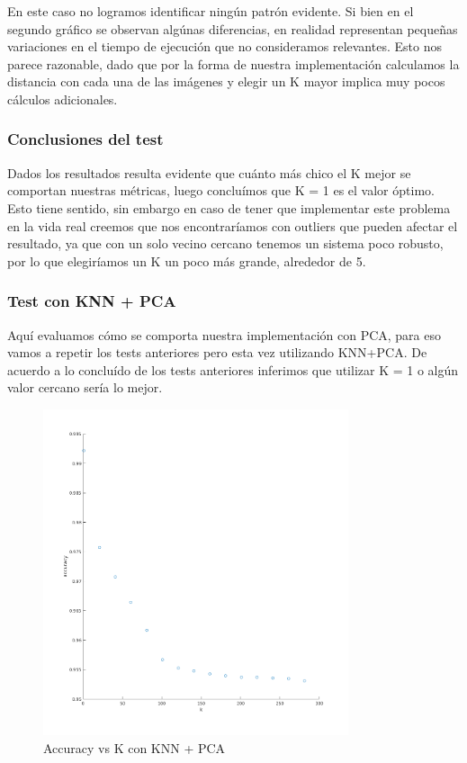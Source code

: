 En este caso no logramos identificar ningún patrón evidente. Si bien en el segundo gráfico se observan algúnas diferencias, en realidad representan pequeñas variaciones en el tiempo de ejecución que no consideramos relevantes.
Esto nos parece razonable, dado que por la forma de nuestra implementación calculamos la distancia con cada una de las imágenes y elegir un K mayor implica muy pocos cálculos adicionales.


\subsubsection*{Conclusiones del test}
Dados los resultados resulta evidente que cuánto más chico el K mejor se comportan nuestras métricas, luego concluímos que K = 1 es el valor óptimo.
Esto tiene sentido, sin embargo en caso de tener que implementar este problema en la vida real creemos que nos encontraríamos con outliers que pueden afectar el resultado, ya que con un solo vecino cercano tenemos un sistema poco robusto, por lo que elegiríamos un K un poco más grande, alrededor de 5.

\subsubsection*{Test con KNN + PCA}
Aquí evaluamos cómo se comporta nuestra implementación con PCA, para eso vamos a repetir los tests anteriores pero esta vez utilizando KNN+PCA.
De acuerdo a lo concluído de los tests anteriores inferimos que utilizar K = 1 o algún valor cercano sería lo mejor. 



\begin{figure}[H]
	\centering
	\includegraphics[width=0.8\textwidth]{img/k_pca_accu.png}
	\caption{Accuracy vs K con KNN + PCA}
	\label{fig:K vs Accuracy con KNN + PCA}
\end{figure}

